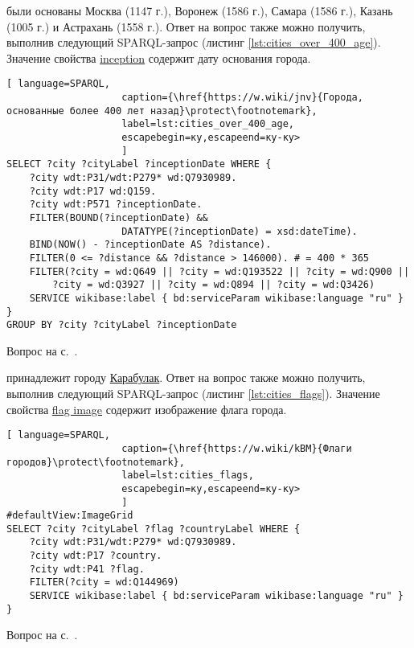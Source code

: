 \begin{task}
    \label{answer:cities_over_400_age}
     были основаны Москва (1147 г.), Воронеж (1586 г.), Самара (1586 г.), Казань (1005 г.) и Астрахань (1558 г.). Ответ на вопрос также можно получить, выполнив следующий SPARQL-запрос (листинг \ref{lst:cities_over_400_age}). Значение свойства \href{https://www.wikidata.org/wiki/Property:P571}{inception} содержит дату основания города.
    \begin{lstlisting}[ language=SPARQL, 
                    caption={\href{https://w.wiki/jnv}{Города, основанные более 400 лет назад}\protect\footnotemark},
                    label=lst:cities_over_400_age, 
                    escapebegin=ку,escapeend=ку-ку>
                    ]
SELECT ?city ?cityLabel ?inceptionDate WHERE {
	?city wdt:P31/wdt:P279* wd:Q7930989.
	?city wdt:P17 wd:Q159.
	?city wdt:P571 ?inceptionDate.
	FILTER(BOUND(?inceptionDate) && 
					DATATYPE(?inceptionDate) = xsd:dateTime).
	BIND(NOW() - ?inceptionDate AS ?distance).
	FILTER(0 <= ?distance && ?distance > 146000). # = 400 * 365
	FILTER(?city = wd:Q649 || ?city = wd:Q193522 || ?city = wd:Q900 ||
		?city = wd:Q3927 || ?city = wd:Q894 || ?city = wd:Q3426)
	SERVICE wikibase:label { bd:serviceParam wikibase:language "ru" }
}
GROUP BY ?city ?cityLabel ?inceptionDate    
\end{lstlisting}

    \small{Вопрос на с.~\pageref{fig:city_relation_Russia_S_N}.}
\end{task}

\begin{task}
    \label{answer:cities_flags}
     принадлежит городу \href{https://w.wiki/oLF}{Карабулак}. Ответ на вопрос также можно получить, выполнив следующий SPARQL-запрос (листинг \ref{lst:cities_flags}). Значение свойства \href{https://www.wikidata.org/wiki/Property:P41}{flag image} содержит изображение флага города.
    
    \begin{lstlisting}[ language=SPARQL, 
                    caption={\href{https://w.wiki/kBM}{Флаги городов}\protect\footnotemark},
                    label=lst:cities_flags, 
                    escapebegin=ку,escapeend=ку-ку>
                    ]
#defaultView:ImageGrid
SELECT ?city ?cityLabel ?flag ?countryLabel WHERE {
	?city wdt:P31/wdt:P279* wd:Q7930989.
	?city wdt:P17 ?country.
	?city wdt:P41 ?flag.
	FILTER(?city = wd:Q144969)
	SERVICE wikibase:label { bd:serviceParam wikibase:language "ru" }
}
\end{lstlisting}
    
    \small{Вопрос на с.~\pageref{lst:countries_sister_cities_with_Russia}.}
\end{task}

